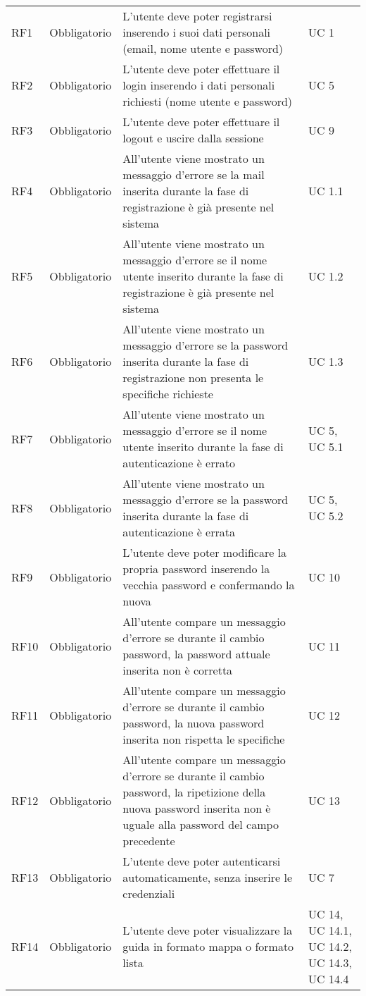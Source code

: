 {\begin{longtable}{C{.257\freewidth} C{.257\freewidth} C{.257\freewidth} C{.257\freewidth}}
      RF1 & Obbligatorio & L’utente deve poter registrarsi inserendo i suoi dati personali (email, nome utente e password) & UC 1 \\
      RF2 & Obbligatorio & L’utente deve poter effettuare il login inserendo i dati personali richiesti (nome utente e password) & UC 5 \\
      RF3 & Obbligatorio & L’utente deve poter effettuare il logout e uscire dalla sessione & UC 9 \\
      RF4 & Obbligatorio & All’utente viene mostrato un messaggio d’errore se la mail inserita durante la fase di registrazione è già presente nel sistema  & UC 1.1 \\
      RF5 & Obbligatorio & All’utente viene mostrato un messaggio d’errore se il nome utente inserito durante la fase di registrazione è già presente nel sistema & UC 1.2 \\
      RF6 & Obbligatorio & All’utente viene mostrato un messaggio d’errore se la password inserita durante la fase di registrazione non presenta le specifiche richieste & UC 1.3 \\
      RF7 & Obbligatorio & All’utente viene mostrato un messaggio d’errore se il nome utente inserito durante la fase di autenticazione è errato & UC 5, UC 5.1 \\
      RF8 & Obbligatorio & All’utente viene mostrato un messaggio d’errore se la password inserita durante la fase di autenticazione è errata & UC 5, UC 5.2 \\
      RF9 & Obbligatorio & L’utente deve poter modificare la propria password inserendo la vecchia password e confermando la nuova & UC 10 \\
      RF10 & Obbligatorio & All’utente compare un messaggio d’errore se durante il cambio password, la password attuale inserita non è corretta & UC 11 \\
      RF11 & Obbligatorio & All’utente compare un messaggio d’errore se durante il cambio password, la nuova password inserita non rispetta le specifiche & UC 12 \\
      RF12 & Obbligatorio & All’utente compare un messaggio d’errore se durante il cambio password, la ripetizione della nuova password inserita non è uguale alla password del campo precedente & UC 13 \\
      RF13 & Obbligatorio & L’utente deve poter autenticarsi automaticamente, senza inserire le credenziali & UC 7 \\
      RF14 & Obbligatorio & L’utente deve poter visualizzare la guida in formato mappa o formato lista & UC 14, UC 14.1, UC 14.2, UC 14.3, UC 14.4 \\

\end{longtable}}
